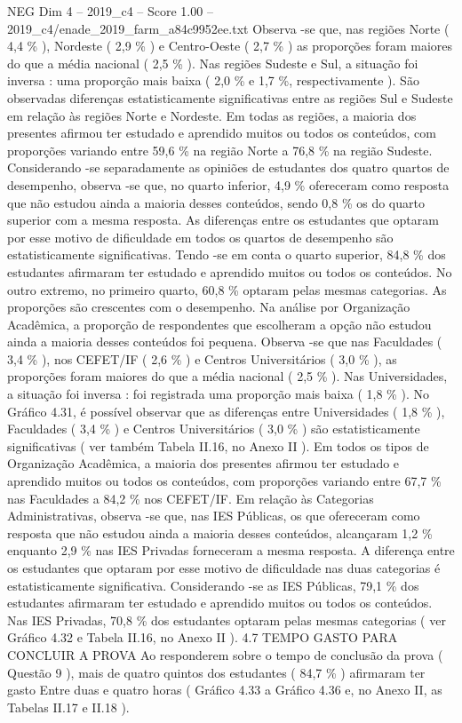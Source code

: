 \begin{textsample}{NEG Dim 4 – 2019\_c4 – Score 1.00 – 2019\_c4/enade\_2019\_farm\_a84c9952ee.txt}
Observa -se que, nas regiões Norte ( 4,4 \% ), Nordeste ( 2,9 \% ) e Centro-Oeste ( 2,7 \% ) as proporções foram maiores do que a média nacional ( 2,5 \% ).
Nas regiões Sudeste e Sul, a situação foi inversa : uma proporção mais baixa ( 2,0 \% e 1,7 \%, respectivamente ).
São observadas diferenças estatisticamente significativas entre as regiões Sul e Sudeste em relação às regiões Norte e Nordeste.
Em todas as regiões, a maioria dos presentes afirmou ter estudado e aprendido muitos ou todos os conteúdos, com proporções variando entre 59,6 \% na região Norte a 76,8 \% na região Sudeste.
Considerando -se separadamente as opiniões de estudantes dos quatro quartos de desempenho, observa -se que, no quarto inferior, 4,9 \% ofereceram como resposta que não estudou ainda a maioria desses conteúdos, sendo 0,8 \% os do quarto superior com a mesma resposta.
As diferenças entre os estudantes que optaram por esse motivo de dificuldade em todos os quartos de desempenho são estatisticamente significativas.
Tendo -se em conta o quarto superior, 84,8 \% dos estudantes afirmaram ter estudado e aprendido muitos ou todos os conteúdos.
No outro extremo, no primeiro quarto, 60,8 \% optaram pelas mesmas categorias.
As proporções são crescentes com o desempenho.
Na análise por Organização Acadêmica, a proporção de respondentes que escolheram a opção não estudou ainda a maioria desses conteúdos foi pequena.
Observa -se que nas Faculdades ( 3,4 \% ), nos CEFET/IF ( 2,6 \% ) e Centros Universitários ( 3,0 \% ), as proporções foram maiores do que a média nacional ( 2,5 \% ).
Nas Universidades, a situação foi inversa : foi registrada uma proporção mais baixa ( 1,8 \% ).
No Gráfico 4.31, é possível observar que as diferenças entre Universidades ( 1,8 \% ), Faculdades ( 3,4 \% ) e Centros Universitários ( 3,0 \% ) são estatisticamente significativas ( ver também Tabela II.16, no Anexo II ).
Em todos os tipos de Organização Acadêmica, a maioria dos presentes afirmou ter estudado e aprendido muitos ou todos os conteúdos, com proporções variando entre 67,7 \% nas Faculdades a 84,2 \% nos CEFET/IF.
Em relação às Categorias Administrativas, observa -se que, nas IES Públicas, os que ofereceram como resposta que não estudou ainda a maioria desses conteúdos, alcançaram 1,2 \% enquanto 2,9 \% nas IES Privadas forneceram a mesma resposta.
A diferença entre os estudantes que optaram por esse motivo de dificuldade nas duas categorias é estatisticamente significativa.
Considerando -se as IES Públicas, 79,1 \% dos estudantes afirmaram ter estudado e aprendido muitos ou todos os conteúdos.
Nas IES Privadas, 70,8 \% dos estudantes optaram pelas mesmas categorias ( ver Gráfico 4.32 e Tabela II.16, no Anexo II ). 4.7 TEMPO GASTO PARA CONCLUIR A PROVA Ao responderem sobre o tempo de conclusão da prova ( Questão 9 ), mais de quatro quintos dos estudantes ( 84,7 \% ) afirmaram ter gasto Entre duas e quatro horas ( Gráfico 4.33 a Gráfico 4.36 e, no Anexo II, as Tabelas II.17 e II.18 ).

\end{textsample}
